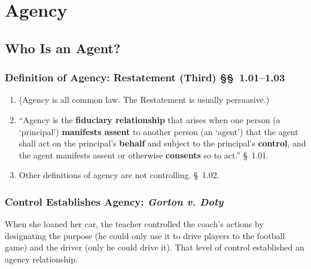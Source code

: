 \section{Agency}

\subsection{Who Is an Agent?}

\subsubsection{Definition of Agency: Restatement (Third) \S\S\ 1.01--1.03}

\begin{enumerate}
    \item (Agency is all common law. The Restatement is usually persuasive.)
    \item ``Agency is the \textbf{fiduciary relationship} that arises when one 
    person (a `principal') \textbf{manifests assent} to another person (an `agent') 
    that the agent shall act on the principal's \textbf{behalf} and subject to 
    the principal's \textbf{control}, and the agent manifests assent or 
    otherwise \textbf{consents} so to act.'' \S\ 1.01.
    \item Other definitions of agency are not controlling. \S\ 1.02.
\end{enumerate}

\subsubsection{Control Establishes Agency: \emph{Gorton v. Doty}}
\label{subsub:gorton}

When she loaned her car, the teacher controlled the coach's actions by 
designating the purpose (he could only use it to drive players to the football 
game) and the driver (only he could drive it). That level of control 
established an agency relationship.

